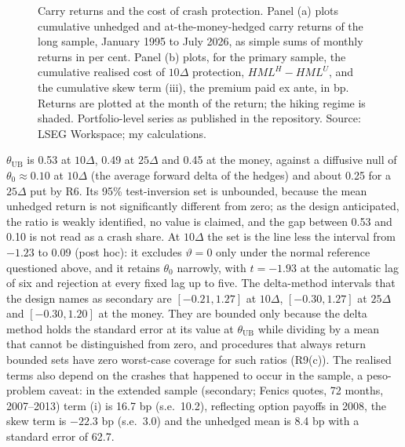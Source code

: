 \documentclass[11pt]{article}
\theoremstyle{result}
\newcommand{\HML}{\mathit{HML}}
\newcommand{\thUB}{\theta_{\mathrm{UB}}}
\newcommand{\D}{\Delta}
\begin{document}
\begin{figure}[t]
\centering

\caption{Carry returns and the cost of crash protection. Panel (a) plots cumulative unhedged and at-the-money-hedged carry returns of the long sample, January 1995 to July 2026, as simple sums of monthly returns in per cent. Panel (b) plots, for the primary sample, the cumulative realised cost of $10\D$ protection, $\HML^H-\HML^U$, and the cumulative skew term (iii), the premium paid ex ante, in bp. Returns are plotted at the month of the return; the hiking regime is shaded. Portfolio-level series as published in the repository. Source: LSEG Workspace; my calculations.}\label{fig:e3}
\end{figure}

$\thUB$ is 0.53 at $10\D$, 0.49 at $25\D$ and 0.45 at the money, against a diffusive null of $\theta_0\approx0.10$ at $10\D$ (the average forward delta of the hedges) and about 0.25 for a $25\D$ put by R6. Its 95\% test-inversion set is unbounded, because the mean unhedged return is not significantly different from zero; as the design anticipated, the ratio is weakly identified, no value is claimed, and the gap between 0.53 and 0.10 is not read as a crash share. At $10\D$ the set is the line less the interval from $-1.23$ to 0.09 (post hoc): it excludes $\vartheta=0$ only under the normal reference questioned above, and it retains $\theta_0$ narrowly, with $t=-1.93$ at the automatic lag of six and rejection at every fixed lag up to five. The delta-method intervals that the design names as secondary are $[-0.21,1.27]$ at $10\D$, $[-0.30,1.27]$ at $25\D$ and $[-0.30,1.20]$ at the money. They are bounded only because the delta method holds the standard error at its value at $\thUB$ while dividing by a mean that cannot be distinguished from zero, and procedures that always return bounded sets have zero worst-case coverage for such ratios (R9(c)). The realised terms also depend on the crashes that happened to occur in the sample, a peso-problem caveat: in the extended sample (secondary; Fenics quotes, 72 months, 2007--2013) term (i) is 16.7 bp (s.e.\ 10.2), reflecting option payoffs in 2008, the skew term is $-22.3$ bp (s.e.\ 3.0) and the unhedged mean is 8.4 bp with a standard error of 62.7.
\end{document}
